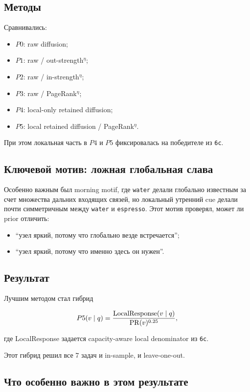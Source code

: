 \subsection{Методы}

Сравнивались:

\begin{itemize}[leftmargin=2em]
\item $P0$: raw diffusion;
\item $P1$: raw / out-strength$^\eta$;
\item $P2$: raw / in-strength$^\eta$;
\item $P3$: raw / PageRank$^\eta$;
\item $P4$: local-only retained diffusion;
\item $P5$: local retained diffusion / PageRank$^\eta$.
\end{itemize}

При этом локальная часть в $P4$ и $P5$ фиксировалась на победителе из
\texttt{6c}.

\subsection{Ключевой мотив: ложная глобальная слава}

Особенно важным был morning motif, где \texttt{water} делали глобально известным
за счет множества дальних входящих связей, но локальный утренний cue делали почти
симметричным между \texttt{water} и \texttt{espresso}. Этот мотив проверял,
может ли prior отличить:

\begin{itemize}[leftmargin=2em]
\item ``узел яркий, потому что глобально везде встречается'';
\item ``узел яркий, потому что именно здесь он нужен''.
\end{itemize}

\subsection{Результат}

Лучшим методом стал гибрид

\[
P5(v\mid q)=\frac{\text{LocalResponse}(v\mid q)}{\mathrm{PR}(v)^{0.25}},
\]

где LocalResponse задается capacity-aware local denominator из \texttt{6c}.

Этот гибрид решил все 7 задач и in-sample, и leave-one-out.

\subsection{Что особенно важно в этом результате}

